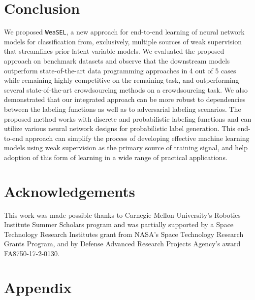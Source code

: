 \documentclass{article}
\newcommand{\weasel}{\texttt{WeaSEL}}\newcommand{\brackets}[1]{\left( #1 \right)}
\begin{document}
\section{Conclusion}
We proposed \weasel, a new approach for end-to-end learning of  neural network models for classification from, exclusively, multiple sources of weak supervision that streamlines prior latent variable models. 
We evaluated the proposed approach on benchmark datasets and observe that the downstream models outperform state-of-the-art data programming approaches in 4 out of 5 cases while remaining highly competitive on the remaining task, and outperforming several state-of-the-art crowdsourcing methods on a crowdsourcing task. 
We also demonstrated that our integrated approach can be more robust to dependencies between the labeling functions as well as to adversarial labeling scenarios. 
The proposed method works with discrete and probabilistic labeling functions and can utilize various neural network designs for probabilistic label generation. 
This end-to-end approach can simplify the process of developing effective machine learning models using weak supervision as the primary source of training signal, 
and help adoption of this form of learning in a wide range of practical applications.
%
 


\newpage
\section*{Acknowledgements}
This work was made possible thanks to Carnegie Mellon University's Robotics Institute Summer Scholars program and was partially supported by a Space Technology Research Institutes grant from NASA’s Space Technology Research Grants Program, and by Defense Advanced Research Projects Agency's award FA8750-17-2-0130.


 


\clearpage
\appendix
\section*{Appendix}
\end{document}
